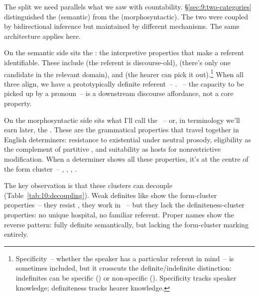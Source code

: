 The split we need parallels what we saw with countability. §\ref{sec:9:two-categories} distinguished the  (semantic) from the  (morphosyntactic). The two were coupled by bidirectional inference but maintained by different mechanisms. The same architecture applies here.

On the semantic side sits the : the interpretive properties that make a referent identifiable. These include  (the referent is discourse-old),  (there's only one candidate in the relevant domain), and  (the hearer can pick it out).\footnote{Specificity~-- whether the speaker has a particular referent in mind~-- is sometimes included, but it crosscuts the definite/indefinite distinction: indefinites can be specific () or non-specific (). Specificity tracks speaker knowledge; definiteness tracks hearer knowledge.} When all three align, we have a prototypically definite referent~-- . ~-- the capacity to be picked up by a pronoun~-- is a downstream discourse affordance, not a core property.

On the morphosyntactic side sits what I'll call the ~-- or, in terminology we'll earn later, the . These are the grammatical properties that travel together in English determiners: resistance to existential  under neutral prosody, eligibility as the complement of partitive , and suitability as hosts for nonrestrictive modification. When a determiner shows all these properties, it's at the centre of the form cluster~-- , , , .

The key observation is that these clusters can decouple (Table~\ref{tab:10:decoupling}). Weak definites like  show the form-cluster properties~-- they resist , they work in ~-- but they lack the definiteness-cluster properties: no unique hospital, no familiar referent. Proper names show the reverse pattern: fully definite semantically, but lacking the form-cluster marking entirely.

